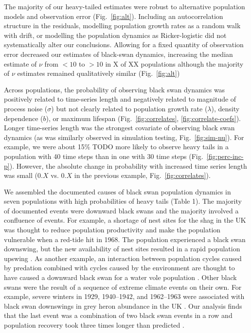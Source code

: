The majority of our heavy-tailed estimates were robust to alternative population models and observation error (Fig.~\ref{fig:alt}). Including an autocorrelation structure in the residuals, modelling population growth rates as a random walk with drift, or modelling the population dynamics as Ricker-logistic did not systematically alter our conclusions. Allowing for a fixed quantity of observation error decreased our estimates of black-swan dynamics, increasing the median estimate of $\nu$ from $<10$ to $>10$ in X of XX populations although the majority of $\nu$ estimates remained qualitatively similar (Fig.~\ref{fig:alt})

Across populations, the probability of observing black swan dynamics was positively related to time-series length and negatively related to magnitude of process noise ($\sigma$) but not clearly related to population growth rate ($\lambda$), density dependence ($b$), or maximum lifespan (Fig.~\ref{fig:correlates}, \ref{fig:correlate-coefs}). Longer time-series length was the strongest covariate of observing black swan dynamics (as was similarly observed in simulation testing, Fig.~\ref{fig:sim-nu}). For example, we were about 15\% TODO more likely to observe heavy tails in a population with 40 time steps than in one with 30 time steps (Fig.~\ref{fig:perc-inc-p}). However, the absolute change in probability with increased time series length was small ($0.X$ vs. $0.X$ in the previous example, Fig.~\ref{fig:correlates}).

We assembled the documented causes of black swan population dynamics in seven populations with high probabilities of heavy tails (Table 1). The majority of documented events were downward black swans and the majority involved a confluence of events. For example, a shortage of nest sites for the shag in the UK was thought to reduce population productivity and make the population vulnerable when a red-tide hit in 1968. The population experienced a black swan downswing, but the new availability of nest sites resulted in a rapid population upswing \citep{potts1980}. As another example, an interaction between population cycles caused by predation combined with cycles caused by the environment are thought to have caused a downward black swan for a water vole population \citep{saucy1994}. Other black swans were the result of a sequence of extreme climate events on their own. For example, severe winters in 1929, 1940--1942, and 1962--1963 were associated with black swan downswings in grey heron abundance in the UK \citep{stafford1971}. Our analysis finds that the last event was a combination of two black swan events in a row and population recovery took three times longer than predicted \citep{stafford1971}.


